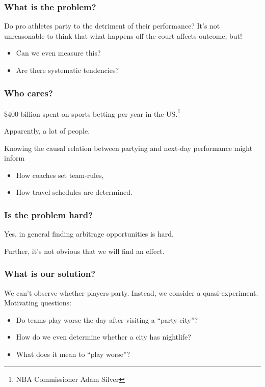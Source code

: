 \documentclass{beamer}
\begin{document}
  \begin{frame} \maketitle \end{frame}

\begin{frame}   \frametitle{What is the problem?}
  \begin{block}{Do pro athletes party to the detriment of their performance?}
    It's not unreasonable to think that what happens off the court affects outcome, but!
    \begin{itemize}       \item Can we even measure this?
      \item Are there systematic tendencies?     \end{itemize}
  \end{block} \end{frame}

\begin{frame}   
  \frametitle{Who cares?}
  \begin{block}{\$400 billion spent on sports betting per year in the US.\footnote{NBA Commissioner Adam Silver}}

    Apparently, a lot of people. 

    Knowing the causal relation between partying and next-day performance might inform
    \begin{itemize}       \item How coaches set team-rules, 
      \item How travel schedules are determined.     \end{itemize}
  \end{block}
\end{frame}

\begin{frame}   \frametitle{Is the problem hard?}
  Yes, in general finding arbitrage opportunities is hard.

  Further, it's not obvious that we will find an effect. \end{frame}

\begin{frame}   
  \frametitle{What is our solution?}
  \begin{block}{We can't observe whether players party.}
    Instead, we consider a quasi-experiment. Motivating questions:
    \begin{itemize}       \item Do teams play worse the day after visiting a ``party city''?
      \item How do we even determine whether a city has nightlife?    
      \item What does it mean to ``play worse''? \end{itemize}
  \end{block}
\end{frame}
\end{document}
